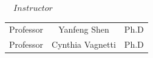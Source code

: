 \begin{titlepage}
\begin{center}
\begin{tabular}{cl}
\end{tabular}
\end{center}

\normalsize
\vspace*{1em}
\begin{center}
\large
$\hspace{1em}Instructor$\\
\vspace*{1em}
\begin{tabular}{lcl}
\large
Professor\hspace{0.5em}\vspace{0.3em} &\hspace{0.5em}Yanfeng Shen\hspace{0.5em}&\hspace{0.5em}Ph.D\\ 
Professor\hspace{0.5em} &\hspace{0.5em}Cynthia Vagnetti \hspace{0.5em}&\hspace{0.5em}Ph.D\\ 
\end{tabular}
\end{center}
\end{titlepage}